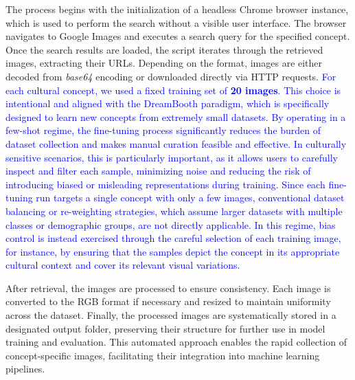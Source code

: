 \documentclass[pdflatex,sn-mathphys-num]{sn-jnl}%
\theoremstyle{thmstyleone}%
\theoremstyle{thmstyletwo}%
\theoremstyle{thmstylethree}%
\begin{document}
The process begins with the initialization of a headless Chrome browser instance, which is used to perform the search without a visible user interface. The browser navigates to Google Images and executes a search query for the specified concept. Once the search results are loaded, the script iterates through the retrieved images, extracting their URLs. Depending on the format, images are either decoded from \textit{base64} encoding or downloaded directly via HTTP requests. \textcolor{blue}{For each cultural concept, we used a fixed training set of \textbf{20 images}. This choice is intentional and aligned with the DreamBooth paradigm, which is specifically designed to learn new concepts from extremely small datasets. By operating in a few-shot regime, the fine-tuning process significantly reduces the burden of dataset collection and makes manual curation feasible and effective. In culturally sensitive scenarios, this is particularly important, as it allows users to carefully inspect and filter each sample, minimizing noise and reducing the risk of introducing biased or misleading representations during training.
} \textcolor{blue}{Since each fine-tuning run targets a single concept with only a few images, conventional dataset balancing or re-weighting strategies, which assume larger datasets with multiple classes or demographic groups, are not directly applicable. In this regime, bias control is instead exercised through the careful selection of each training image, for instance, by ensuring that the samples depict the concept in its appropriate cultural context and cover its relevant visual variations.}

After retrieval, the images are processed to ensure consistency. Each image is converted to the RGB format if necessary and resized to maintain uniformity across the dataset. Finally, the processed images are systematically stored in a designated 	output folder, preserving their structure for further use in model training and evaluation. This automated approach enables the rapid collection of concept-specific images, facilitating their integration into machine learning pipelines.
\end{document}
